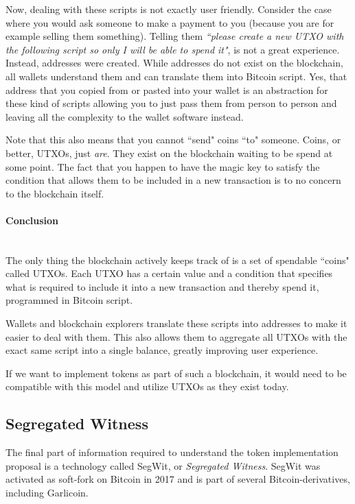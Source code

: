 \documentclass{article}
\begin{document}
Now, dealing with these scripts is not exactly user friendly. Consider the case where you would ask someone to make a payment to you (because you are for example selling them something). Telling them \emph{``please create a new UTXO with the following script so only I will be able to spend it"}, is not a great experience. Instead, addresses were created. While addresses do not exist on the blockchain, all wallets understand them and can translate them into Bitcoin script. Yes, that address that you copied from or pasted into your wallet is an abstraction for these kind of scripts allowing you to just pass them from person to person and leaving all the complexity to the wallet software instead.

Note that this also means that you cannot ``send" coins ``to" someone. Coins, or better, UTXOs, just \emph{are}. They exist on the blockchain waiting to be spend at some point. The fact that you happen to have the magic key to satisfy the condition that allows them to be included in a new transaction is to no concern to the blockchain itself.

\paragraph{Conclusion}\mbox{}\\
The only thing the blockchain actively keeps track of is a set of spendable ``coins" called UTXOs. Each UTXO has a certain value and a condition that specifies what is required to include it into a new transaction and thereby spend it, programmed in Bitcoin script.

Wallets and blockchain explorers translate these scripts into addresses to make it easier to deal with them. This also allows them to aggregate all UTXOs with the exact same script into a single balance, greatly improving user experience.

If we want to implement tokens as part of such a blockchain, it would need to be compatible with this model and utilize UTXOs as they exist today.

\subsection{Segregated Witness}

The final part of information required to understand the token implementation proposal is a technology called SegWit, or \emph{Segregated Witness}. SegWit was activated as soft-fork on Bitcoin in 2017 and is part of several Bitcoin-derivatives, including Garlicoin.
\end{document}

